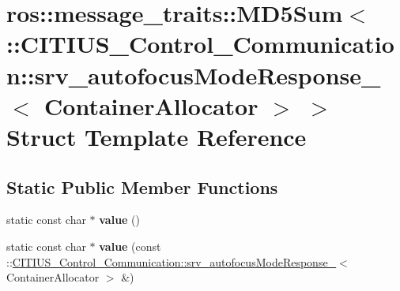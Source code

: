 \hypertarget{structros_1_1message__traits_1_1_m_d5_sum_3_01_1_1_c_i_t_i_u_s___control___communication_1_1srv_b6d78007e944a80cc28a20ebb8b4ceda}{\section{ros\-:\-:message\-\_\-traits\-:\-:\-M\-D5\-Sum$<$ \-:\-:\-C\-I\-T\-I\-U\-S\-\_\-\-Control\-\_\-\-Communication\-:\-:srv\-\_\-autofocus\-Mode\-Response\-\_\-$<$ \-Container\-Allocator $>$ $>$ \-Struct \-Template \-Reference}
\label{structros_1_1message__traits_1_1_m_d5_sum_3_01_1_1_c_i_t_i_u_s___control___communication_1_1srv_b6d78007e944a80cc28a20ebb8b4ceda}
}
\subsection*{\-Static \-Public \-Member \-Functions}
\begin{DoxyCompactItemize}
\item 
\hypertarget{structros_1_1message__traits_1_1_m_d5_sum_3_01_1_1_c_i_t_i_u_s___control___communication_1_1srv_b6d78007e944a80cc28a20ebb8b4ceda_aa60647cf7488aa6a55b2f2fa802981b4}{static const char $\ast$ {\bfseries value} ()}\label{structros_1_1message__traits_1_1_m_d5_sum_3_01_1_1_c_i_t_i_u_s___control___communication_1_1srv_b6d78007e944a80cc28a20ebb8b4ceda_aa60647cf7488aa6a55b2f2fa802981b4}

\item 
\hypertarget{structros_1_1message__traits_1_1_m_d5_sum_3_01_1_1_c_i_t_i_u_s___control___communication_1_1srv_b6d78007e944a80cc28a20ebb8b4ceda_a90e54d07f80652bad08115adb2e82da5}{static const char $\ast$ {\bfseries value} (const \-::\hyperlink{struct_c_i_t_i_u_s___control___communication_1_1srv__autofocus_mode_response__}{\-C\-I\-T\-I\-U\-S\-\_\-\-Control\-\_\-\-Communication\-::srv\-\_\-autofocus\-Mode\-Response\-\_\-}$<$ \-Container\-Allocator $>$ \&)}\label{structros_1_1message__traits_1_1_m_d5_sum_3_01_1_1_c_i_t_i_u_s___control___communication_1_1srv_b6d78007e944a80cc28a20ebb8b4ceda_a90e54d07f80652bad08115adb2e82da5}

\end{DoxyCompactItemize}
